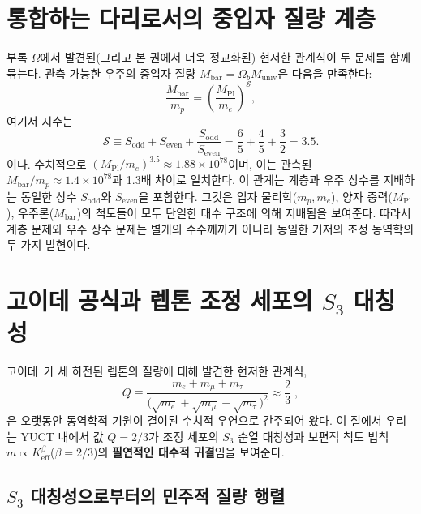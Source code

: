 \documentclass[11pt,a4paper]{article}
\theoremstyle{remark}
\begin{document}
	\section{통합하는 다리로서의 중입자 질량 계층}
	
	부록 $\Omega$에서 발견된(그리고 본 권에서 더욱 정교화된) 현저한 관계식이 두 문제를 함께 묶는다. 관측 가능한 우주의 중입자 질량 \(M_{\mathrm{bar}} = \Omega_b M_{\mathrm{univ}}\)은 다음을 만족한다:
	\begin{equation}
		\frac{M_{\mathrm{bar}}}{m_p} = \left( \frac{M_{\mathrm{Pl}}}{m_e} \right)^{\mathcal{S}},
		\label{eq:baryon-hierarchy}
	\end{equation}
	여기서 지수는
	\begin{equation}
		\mathcal{S} \equiv S_{\mathrm{odd}} + S_{\mathrm{even}} + \frac{S_{\mathrm{odd}}}{S_{\mathrm{even}}} = \frac{6}{5} + \frac{4}{5} + \frac{3}{2} = 3.5.
	\end{equation}
	이다. 수치적으로 \((M_{\mathrm{Pl}}/m_e)^{3.5} \approx 1.88 \times 10^{78}\)이며, 이는 관측된 \(M_{\mathrm{bar}}/m_p \approx 1.4 \times 10^{78}\)과 1.3배 차이로 일치한다. 이 관계는 계층과 우주 상수를 지배하는 동일한 상수 \(S_{\mathrm{odd}}\)와 \(S_{\mathrm{even}}\)을 포함한다. 그것은 입자 물리학(\(m_p, m_e\)), 양자 중력(\(M_{\mathrm{Pl}}\)), 우주론(\(M_{\mathrm{bar}}\))의 척도들이 모두 단일한 대수 구조에 의해 지배됨을 보여준다. 따라서 계층 문제와 우주 상수 문제는 별개의 수수께끼가 아니라 동일한 기저의 조정 동역학의 두 가지 발현이다.
	
	\section{고이데 공식과 렙톤 조정 세포의 \(S_3\) 대칭성}
	\label{sec:koide}
	
	고이데~\cite{Koide1983}가 세 하전된 렙톤의 질량에 대해 발견한 현저한 관계식,
	\begin{equation}
		Q \equiv \frac{m_e + m_\mu + m_\tau}{\bigl(\sqrt{m_e} + \sqrt{m_\mu} + \sqrt{m_\tau}\bigr)^2}
		\approx \frac{2}{3}\;,
	\end{equation}
	은 오랫동안 동역학적 기원이 결여된 수치적 우연으로 간주되어 왔다. 이 절에서 우리는 YUCT 내에서 값 \(Q=2/3\)가 조정 세포의 \(S_3\) 순열 대칭성과 보편적 척도 법칙 \(m \propto K_{\mathrm{eff}}^{\beta}\)(\(\beta=2/3\))의 \textbf{필연적인 대수적 귀결}임을 보여준다.
	
	\subsection{\(S_3\) 대칭성으로부터의 민주적 질량 행렬}
	
\end{document}
